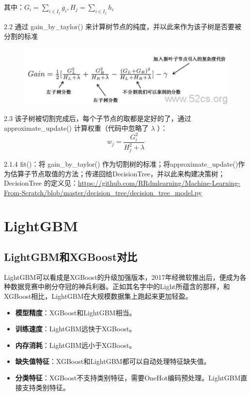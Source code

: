 \documentclass[12pt]{article}
\begin{document}
其中：$G_i = \sum_{i \in I_j} g_i, H_j = \sum_{i \in I_j}h_i$

2.2 通过 gain\_by\_taylor() 来计算树节点的纯度，并以此来作为该子树是否要被分割的标准
\begin{figure}[H]
    \centering
    \includegraphics[width=1\textwidth]{fig/XGBoost_In_Python_Gain_by_taylor.png}
\end{figure}

2.3 该子树被切割完成后，每个子节点的取都是定好的了，通过 approximate\_update() 计算权重（代码中忽略了 $\lambda$ ）：
$$
w_j = \frac{G_i^2}{H_j^2+\lambda}
$$

2.1.4 fit()：将 gain\_by\_taylor() 作为切割树的标准；将approximate\_update()作为估算子节点取值的方法；传递回给DecisionTree，并以此来构建决策树；DecisionTree 的定义见：\url{https://github.com/RRdmlearning/Machine-Learning-From-Scratch/blob/master/decision_tree/decision_tree_model.py}

\section{LightGBM\cite{LightGBM_In_30_Minutes}}
\subsection{LightGBM和XGBoost对比}
LightGBM可以看成是XGBoost的升级加强版本，2017年经微软推出后，便成为各种数据竞赛中刷分夺冠的神兵利器。正如其名字中的Light所蕴含的那样，和XGBoost相比，LightGBM在大规模数据集上跑起来更加轻盈。

\begin{itemize}
\setlength{\itemsep}{0pt}
\setlength{\parsep}{0pt}
\setlength{\parskip}{0pt}
    \item \textbf{模型精度}：XGBoost和LightGBM相当。
    \item \textbf{训练速度}：LightGBM远快于XGBoost。
    \item \textbf{内存消耗}：LightGBM远小于XGBoost。
    \item \textbf{缺失值特征}：XGBoost和LightGBM都可以自动处理特征缺失值。
    \item \textbf{分类特征}：XGBoost不支持类别特征，需要OneHot编码预处理。LightGBM直接支持类别特征。
\end{itemize}
\end{document}
